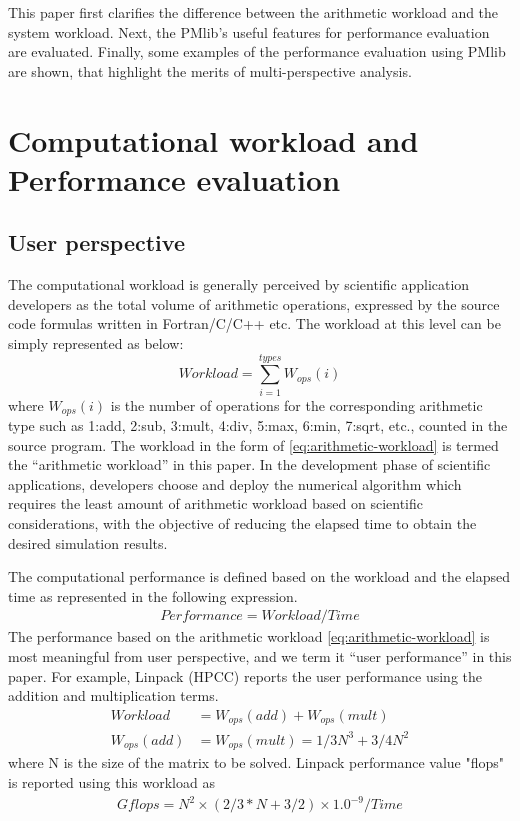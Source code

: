 \documentclass[conference]{IEEEtran}
\begin{document}
This paper first clarifies the difference between the arithmetic workload and
the system workload.
Next, the PMlib's useful features for performance evaluation are evaluated.
Finally, some examples of the performance evaluation using PMlib
are shown, that highlight the merits of multi-perspective analysis.

\section{Computational workload and Performance evaluation}
\label{workload-evaluation}

\subsection{User perspective}
\label{subsection:user-perspective}

The computational workload is generally perceived by scientific application
developers as the total volume of arithmetic operations,
expressed by the source code formulas written in Fortran/C/C++ etc.
The workload at this level can be simply represented as below:
\begin{equation}\label{eq:arithmetic-workload}
	Workload = \sum_{i=1}^{types} W_{ops}(i)
\end{equation}
where $ W_{ops}(i) $ is the number of operations for the
corresponding arithmetic type such as
1:add, 2:sub, 3:mult, 4:div, 5:max, 6:min, 7:sqrt, etc.,
counted in the source program.
The workload in the form of \eqref{eq:arithmetic-workload}
is termed the ``arithmetic workload'' in this paper.
In the development phase of scientific applications, developers
choose and deploy the numerical algorithm which requires the least
amount of arithmetic workload based on scientific considerations,
with the objective of reducing the elapsed time to obtain the desired
simulation results.

The computational performance is defined based on the workload and
the elapsed time as represented in the following expression.
\begin{align}\label{eq:performance-workload-time}
Performance = Workload / Time 
\end{align}
%
The performance based on the arithmetic workload \eqref{eq:arithmetic-workload}
is most meaningful from user perspective,
and we term it ``user performance'' in this paper.
%
For example, Linpack (HPCC)%
reports the user performance using the addition and multiplication terms.
\begin{align}
		Workload & = W_{ops}(add) + W_{ops}(mult) \\
		W_{ops}(add) & = W_{ops}(mult) = 1/3 N^{3} + 3/4 N^{2}
\end{align}
where N is the size of the matrix to be solved.
Linpack performance value "flops" is reported using this workload as
\begin{align}
Gflops = N^{2} \times ( 2/3 * N + 3/2 ) \times 1.0^{-9} / Time 
\end{align}
\end{document}
